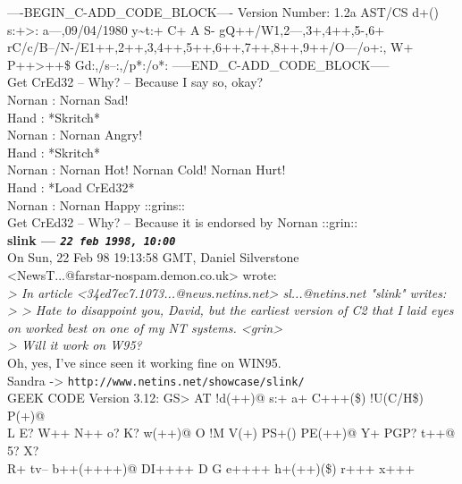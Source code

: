 \documentclass[11pt,twoside,a4paper]{article}
\begin{document}
\begin{multicols*}{2}
----BEGIN\_C-ADD\_CODE\_BLOCK----
Version Number: 1.2a AST/CS d+() s:+>: a---,09/04/1980
y\textasciitilde  t:+ C+ A S- gQ++/W1,2---,3+,4++,5-,6+
rC/c/B--/N-/E1++,2++,3,4++,5++,6++,7++,8++,9++/O---/o+:,
W+ P++>++\$ Gd:,/s--:,/p*:/o*:
-----END\_C-ADD\_CODE\_BLOCK-----~\\

Get CrEd32 -- Why? -- Because I say so, okay?~\\

Nornan : Nornan Sad!~\\
Hand   : *Skritch*~\\
Nornan : Nornan Angry!~\\
Hand   : *Skritch*~\\
Nornan : Nornan Hot! Nornan Cold! Nornan Hurt!~\\
Hand   : *Load CrEd32*~\\
Nornan : Nornan Happy ::grins::~\\

Get CrEd32 -- Why? -- Because it is endorsed by Nornan ::grin::~\\

 
		
	
		
\textbf{slink --- \emph{\texttt{22 feb 1998, 10:00}}}~\\

On Sun, 22 Feb 98 19:13:58 GMT, Daniel Silverstone~\\

<NewsT...@farstar-nospam.demon.co.uk> wrote:~\\
\emph{> In article <34ed7ec7.1073...@news.netins.net> sl...@netins.net "slink" writes:}~\\

\emph{> >  Hate to disappoint you, David, but the earliest version of C2 that I laid eyes on worked best on one of my NT systems.  <grin>}~\\

\emph{> Will it work on W95?}~\\

Oh, yes, I've since seen it working fine on WIN95.~\\

Sandra -> \texttt{http://www.netins.net/showcase/slink/}~\\
GEEK CODE Version 3.12: GS> AT !d(++)@ s:+ a+ C+++(\$) !U(C/H\$) P(+)@~\\
L E? W++ N++ o? K? w(++)@ O !M V(+) PS+() PE(++)@ Y+ PGP? t++@ 5? X?~\\
R+ tv-- b++(++++)@ DI++++ D G e++++ h+(++)(\$) r+++ x+++~\\


\end{multicols*}
\end{document}
